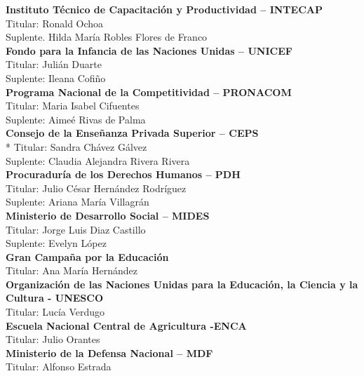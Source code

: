 \begin{multicols}{2}
\begin{center}
	\textbf{Instituto Técnico de Capacitación y Productividad – INTECAP}\\
	Titular: Ronald Ochoa\\
	Suplente. Hilda María Robles Flores de Franco\\ [0.4cm]
	
\textbf{	Fondo para la Infancia de las Naciones Unidas – UNICEF}\\
	Titular: Julián Duarte\\
	Suplente: Ileana Cofiño\\ [0.4cm]
	
	\textbf{Programa Nacional de la Competitividad – PRONACOM}\\
	Titular: Maria Isabel Cifuentes\\
	Suplente: Aimeé Rivas de Palma\\ [0.4cm]
	
\textbf{	Consejo de la Enseñanza Privada Superior – CEPS}\\*
	Titular: Sandra Chávez Gálvez\\
	Suplente: Claudia Alejandra Rivera Rivera\\ [0.4cm]
	
\textbf{	Procuraduría de los Derechos Humanos – PDH}\\
	Titular: Julio César Hernández Rodríguez\\
	Suplente: Ariana María Villagrán\\ [0.4cm]
	
\textbf{	Ministerio de Desarrollo Social – MIDES}\\
	Titular: Jorge Luis Diaz Castillo\\
	Suplente: Evelyn López\\ [0.4cm]
	
\textbf{	Gran Campaña por la Educación}\\
	Titular: Ana María Hernández\\ [0.4cm]
	
\textbf{	Organización de las Naciones Unidas para la Educación, la Ciencia y la Cultura - UNESCO }\\
	Titular: Lucía Verdugo\\ [0.4cm]
	
\textbf{	Escuela Nacional Central de Agricultura -ENCA}\\
	Titular: Julio Orantes\\ [0.4cm]
	
\textbf{	Ministerio de la Defensa Nacional – MDF}\\
	Titular: Alfonso Estrada \\ [0.4cm]
	

\end{center}
\end{multicols}
